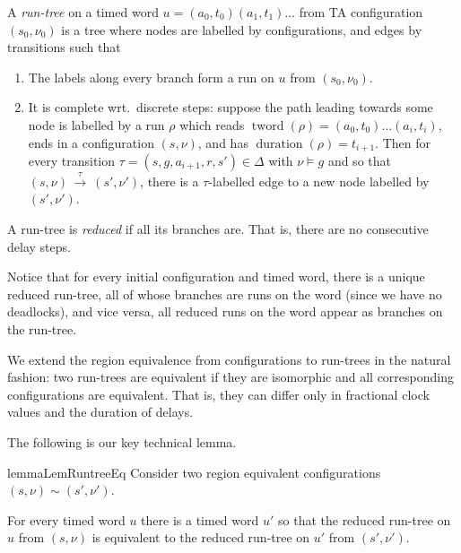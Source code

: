 \documentclass[10pt,a4paper]{amsart}
\theoremstyle{definition}
\numberwithin{equation}{section}
\newcommand{\transitions}{\Delta}
\newcommand{\dur}[1]{\mathop{duration}(#1)}
\newcommand{\tword}[1]{\mathop{tword}(#1)}
\newcommand{\step}[2][]{\Step{#2}{}{#1}}
\newcommand{\Step}[3]{\ensuremath{\,{\stackrel{#1}{\longrightarrow}}{}^{\scriptstyle{#2}}_{\scriptstyle{#3}}}\,}
\newcommand{\req}{\sim}
\begin{document}
\begin{definition}
    A \emph{run-tree} on a timed word $u=(a_0,t_0)(a_1,t_1)\ldots$ from TA configuration $(s_0,\nu_0)$ is a tree
    where nodes are labelled by configurations,
    and edges by transitions such that
    \begin{enumerate}
        \item 
    The labels along every branch form a run on $u$ from $(s_0,\nu_0)$.
\item It is complete wrt.~discrete steps:
    suppose %
    the path leading towards some node is labelled by a run $\rho$
    which reads $\tword{\rho}=(a_0,t_0)\ldots(a_i,t_i)$,
    ends in a configuration $(s,\nu)$,
    and has $\dur{\rho}=t_{i+1}$. %
    Then 
    for 
    every transition $\tau=(s,g,a_{i+1},r,s')\in \transitions$
    with $\nu\models g$
    and so that $(s,\nu)\step{\tau}(s',\nu')$,
    there is a $\tau$-labelled edge to a new node labelled by $(s',\nu')$.
    \end{enumerate}
    A run-tree is \emph{reduced} if all its branches are. That is, there are no consecutive delay steps.
\end{definition}
Notice that for every initial configuration and timed word, there is a unique reduced run-tree,
all of whose branches are runs on the word (since we have no deadlocks),
and vice versa, all reduced runs on the word appear as branches on the run-tree.

We extend the region equivalence from configurations to run-trees in the natural fashion:
two run-trees are equivalent if they are isomorphic and all corresponding configurations are equivalent.
That is, they can differ only in fractional clock values and the duration of delays.



The following is our key technical lemma.


\begin{restatable}{lemma}{LemRuntreeEq}
\label{lem:runtree-eq}
Consider two region equivalent configurations
$(s,\nu)\req(s',\nu')$.

For every timed word $u$
there is a timed word $u'$
so that the reduced run-tree on $u$
from $(s,\nu)$
is equivalent to 
the reduced run-tree on $u'$ from
$(s',\nu')$.
\end{restatable}
\end{document}
